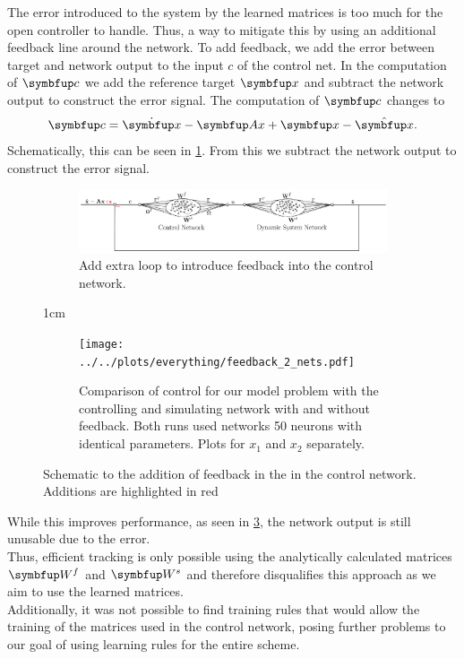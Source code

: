 The error introduced to the system by the learned matrices is too much for the open controller to handle. Thus, a way to mitigate this by using an additional feedback line around the network. To add feedback, we add the error between target and network output to the input $c$ of the control net. In the computation of $\bmu{c}$ we add the reference target $\bmu{x}$ and subtract the network output to construct the error signal. The computation of $\bmu{c}$ changes to
\begin{equation}
\bmu{c} = \dot{\bmu{x}} - \bmu{Ax} + \bmu{x} - \hat{\bmu{x}}.
\end{equation}
Schematically, this can be seen in \cref{fig:schematic_feedback_control_2_nets}. From this we subtract the network output to construct the error signal.
\begin{figure}
	\centering

	\begin{subfigure}{\textwidth}
		\centering
		\includegraphics[width=\textwidth]{svg-inkscape/schematic_controller_network_feedback_2_nets.pdf}
		\caption{Add extra loop to introduce feedback into the control network.}
		\label{fig:schematic_feedback_control_2_nets}
	\end{subfigure}
	\vfill{1cm}
	\begin{subfigure}{\textwidth}
		\centering
		\texttt{[image: ../../plots/everything/feedback\_2\_nets.pdf]}
		\caption{Comparison of control for our model problem with the controlling and simulating network with and without feedback. Both runs used networks 50 neurons with identical parameters. Plots for $x_1$ and $x_2$ separately.}
		\label{fig:feedback_control_2_nets_error}

	\end{subfigure}
	\caption{Schematic to the addition of feedback in the in the control network. Additions are highlighted in red }
\end{figure}

While this improves performance, as seen in \cref{fig:feedback_control_2_nets_error}, the network output is still unusable due to the error.\\
Thus, efficient tracking is only possible using the analytically calculated matrices $\bmu{W}^f$ and $\bmu{W}^s$ and therefore disqualifies this approach as we aim to use the learned matrices.\\ Additionally, it was not possible to find training rules that would allow the training of the matrices used in the control network, posing further problems to our goal of using learning rules for the entire scheme.\\

